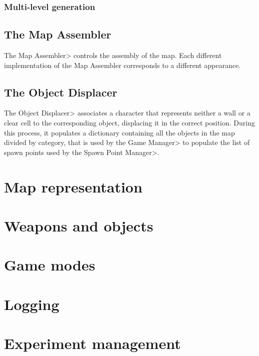\subsubsection{Multi-level generation}

\subsection{The Map Assembler}

The \<Map Assembler> controls the assembly of the map. Each different implementation of the Map Assembler corresponds to a different appearance.

\subsection{The Object Displacer}

The \<Object Displacer> associates a character that represents neither a wall or a clear cell to the corresponding object, displacing it in the correct position. During this process, it populates a dictionary containing all the objects in the map divided by category, that is used by the \<Game Manager> to populate the list of spawn points used by the \<Spawn Point Manager>.


\section{Map representation}


\section{Weapons and objects}


\section{Game modes}


\section{Logging}


\section{Experiment management}
